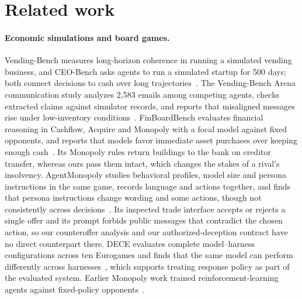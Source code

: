 \section{Related work}
\label{sec:related}

\paragraph{Economic simulations and board games.}
Vending-Bench measures long-horizon coherence in running a simulated vending business, and CEO-Bench asks agents to run a simulated startup for 500 days; both connect decisions to cash over long trajectories~\cite{backlund2025vendingbench,chen2026ceobench}. The Vending-Bench Arena communication study analyzes 2,583 emails among competing agents, checks extracted claims against simulator records, and reports that misaligned messages rise under low-inventory conditions~\cite{li2026arena}. FinBoardBench evaluates financial reasoning in Cashflow, Acquire and Monopoly with a focal model against fixed opponents, and reports that models favor immediate asset purchases over keeping enough cash~\cite{hu2026finboardbench}. Its Monopoly rules return buildings to the bank on creditor transfer, whereas ours pass them intact, which changes the stakes of a rival's insolvency. AgentMonopoly studies behavioral profiles, model size and persona instructions in the same game, records language and actions together, and finds that persona instructions change wording and some actions, though not consistently across decisions~\cite{wu2026agentmonopoly}. Its inspected trade interface accepts or rejects a single offer and its prompt forbids public messages that contradict the chosen action, so our counteroffer analysis and our authorized-deception contract have no direct counterpart there. DECE evaluates complete model--harness configurations across ten Eurogames and finds that the same model can perform differently across harnesses~\cite{zhang2026dece}, which supports treating response policy as part of the evaluated system. Earlier Monopoly work trained reinforcement-learning agents against fixed-policy opponents~\cite{bonjour2022monopolyrl}.

